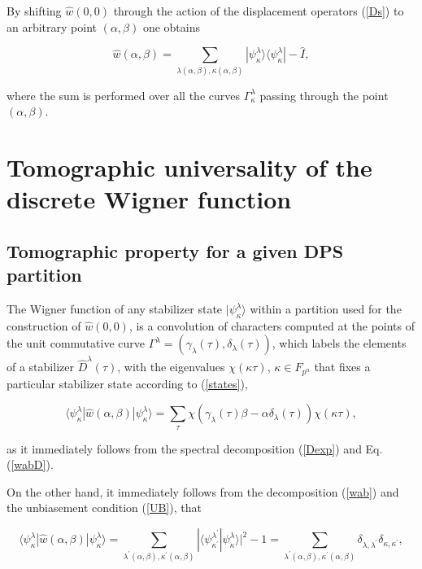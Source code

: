 \documentclass[quantumrep,article,submit,pdftex,moreauthors]{Definitions/mdpi}
\begin{document}
By shifting $\hat{w}\left(0,0\right)$ through the action of the displacement
operators (\ref{Ds}) to an arbitrary point $(\alpha,\beta )$ one obtains

\begin{equation}
  \hat{w}(\alpha, \beta)
  = \sum_{\lambda(\alpha,\beta),\kappa(\alpha,\beta)}
  |\psi _{\kappa }^{\lambda }\rangle \langle \psi _{\kappa }^{\lambda }|
  - \hat{I},
  \label{wab}
\end{equation}

where the sum is performed over all the curves $\Gamma_{\kappa }^{\lambda }$
passing through the point $(\alpha,\beta)$.

\section{Tomographic universality of the discrete Wigner function}

\subsection{Tomographic property for a given DPS partition}

The Wigner function of any stabilizer state $|\psi _{\kappa }^{\lambda }\rangle
$ within a partition used for the construction of $\hat{w}\left( 0,0\right) $,
is a convolution of characters computed at the points of the unit commutative
curve $\Gamma ^{\lambda }=\left( \gamma _{\lambda }\left( \tau \right) ,\delta
_{\lambda }(\tau )\right) $, which labels the elements of a stabilizer
$\hat{D}^{\lambda }(\tau )$, with the eigenvalues $\chi (\kappa \tau )$, $\kappa
\in F_{p^{n}}$ that fixes a particular stabilizer state according to
(\ref{states}),

\begin{equation}
  \langle \psi_{\kappa }^{\lambda }|\hat{w}\left( \alpha ,\beta \right)
  |\psi_{\kappa }^{\lambda }\rangle
  = \sum_{\tau }\chi \left(
    \gamma_{\lambda}(\tau)\beta -\alpha \delta_{\lambda }(\tau )
  \right) \chi (\kappa \tau ),
  \label{T1}
\end{equation}

{\color{teal}as it immediately follows from the spectral decomposition
(\ref{Dexp}) and Eq. (\ref{wabD}).}

{\color{teal}On the other hand, it immediately follows from the decomposition
(\ref{wab}) and the unbiasement condition (\ref{UB}), that}

\begin{equation*}
  \langle \psi_{\kappa }^{\lambda }|\hat{w}\left( \alpha ,\beta \right)
  |\psi_{\kappa }^{\lambda }\rangle
  = \sum_{\lambda^{\prime}(\alpha,\beta),\kappa^{\prime }(\alpha,\beta)}
  |\langle
    \psi_{\kappa^{\prime}}^{\lambda^{\prime }}|\psi_{\kappa}^{\lambda}
  \rangle|^{2}-1
  = \sum_{\lambda^{\prime}(\alpha,\beta),\kappa^{\prime}(\alpha,\beta)}
  \delta_{\lambda,\lambda^{\prime}}\delta_{\kappa,\kappa^{\prime}},
\end{equation*}
\end{document}
